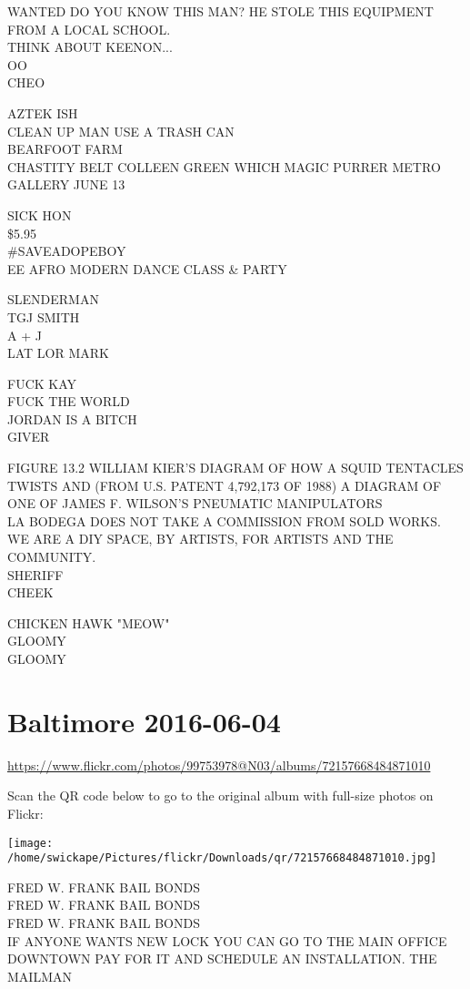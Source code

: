 \documentclass[10pt,letterpaper]{article}
\begin{document}
WANTED DO YOU KNOW THIS MAN?  HE STOLE THIS EQUIPMENT FROM A LOCAL SCHOOL.\\
THINK ABOUT KEENON...\\
OO\\
CHEO

AZTEK ISH\\
CLEAN UP MAN USE A TRASH CAN\\
BEARFOOT FARM\\
CHASTITY BELT COLLEEN GREEN WHICH MAGIC PURRER METRO GALLERY JUNE 13

SICK HON\\
\$5.95\\
\#SAVEADOPEBOY\\
EE AFRO MODERN DANCE CLASS \& PARTY

SLENDERMAN\\
TGJ SMITH\\
A + J\\
LAT LOR MARK

FUCK KAY\\
FUCK THE WORLD\\
JORDAN IS A BITCH\\
GIVER

FIGURE 13.2 WILLIAM KIER'S DIAGRAM OF HOW A SQUID TENTACLES TWISTS AND (FROM U.S. PATENT 4,792,173 OF 1988) A DIAGRAM OF ONE OF JAMES F. WILSON'S PNEUMATIC MANIPULATORS\\
LA BODEGA DOES NOT TAKE A COMMISSION FROM SOLD WORKS.  WE ARE A DIY SPACE, BY ARTISTS, FOR ARTISTS AND THE COMMUNITY.\\
SHERIFF\\
CHEEK

CHICKEN HAWK "MEOW"\\
GLOOMY\\
GLOOMY


\section*{Baltimore 2016-06-04}

\url{https://www.flickr.com/photos/99753978@N03/albums/72157668484871010}

Scan the QR code below to go to the original album with full-size photos on Flickr:

\texttt{[image: /home/swickape/Pictures/flickr/Downloads/qr/72157668484871010.jpg]}


FRED W. FRANK BAIL BONDS\\
FRED W. FRANK BAIL BONDS\\
FRED W. FRANK BAIL BONDS\\
IF ANYONE WANTS NEW LOCK YOU CAN GO TO THE MAIN OFFICE DOWNTOWN PAY FOR IT AND SCHEDULE AN INSTALLATION. THE MAILMAN
\end{document}
